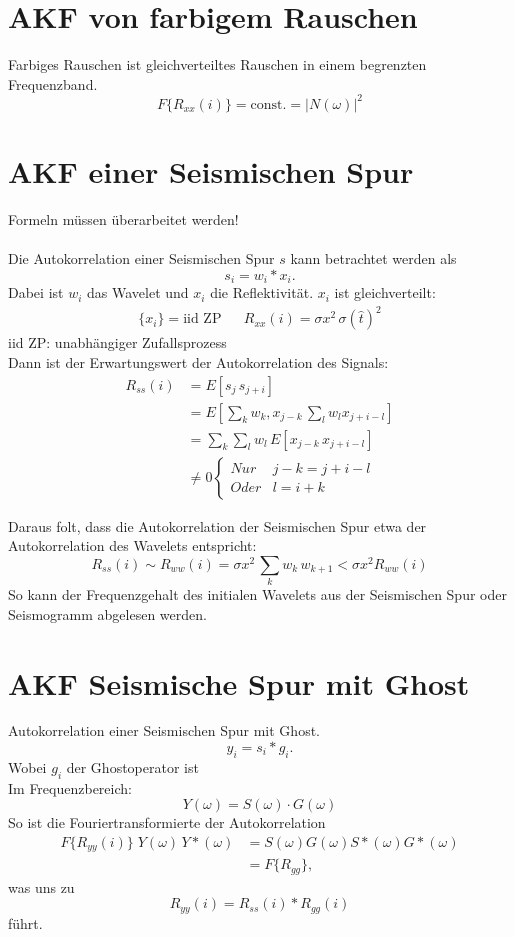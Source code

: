 \section*{AKF von farbigem Rauschen}
Farbiges Rauschen ist gleichverteiltes Rauschen in einem begrenzten Frequenzband.
\[
F\{R_{xx}(i)\} = \mbox{const.} = |N(\omega)|^2
\]

\section*{AKF einer Seismischen Spur}
Formeln müssen überarbeitet werden!\\\\

Die Autokorrelation einer Seismischen Spur $s$ kann betrachtet werden als
\[
s_i = w_i * x_i.
\]
{\small Dabei ist $w_i$ das Wavelet und $x_i$ die Reflektivität.}
$x_i$ ist gleichverteilt:
\begin{align*}
\{x_i\} = \mbox{iid ZP} & & R_{xx}(i) = \sigma x^2 \, \sigma(\hat{t})^2
\end{align*}
{\small iid ZP: unabhängiger Zufallsprozess}\\
Dann ist der Erwartungswert der Autokorrelation des Signals:
\begin{align*}
R_{ss}(i) & = E[s_j\, s_{j+i}]\\
& = E\left[\sum_k w_k, x_{j-k}\, \sum_l w_l x_{j+i-l}\right]\\
& = \sum_k \sum_l w_l\,E[x_{j-k}\,x_{j+i-l}]\\
& \not= 0
\begin{cases}
Nur & j-k = j+i-l\\
Oder & l = i+k
\end{cases}
\end{align*}

Daraus folt, dass die Autokorrelation der Seismischen Spur etwa der Autokorrelation des Wavelets entspricht:
\[
R_{ss}(i) \sim R_{ww}(i) = \sigma x^2 \, \sum_k w_k \, w_{k+1} < \sigma x^2 R_{ww}(i)
\]
So kann der Frequenzgehalt des initialen Wavelets aus der Seismischen Spur oder Seismogramm abgelesen werden.

\section*{AKF Seismische Spur mit Ghost}
Autokorrelation einer Seismischen Spur mit Ghost.
\[
y_i = s_i * g_i.
\]
{\small Wobei $g_i$ der Ghostoperator ist}\\
Im Frequenzbereich:
\[
Y(\omega) = S(\omega) \cdot G(\omega)
\]
So ist die Fouriertransformierte der Autokorrelation
\begin{align*}
F\{R_{yy}(i)\}\;Y(\omega)\,Y*(\omega) & = S(\omega) G(\omega) S*(\omega) G*(\omega)\\
& = F\{R_{gg}\},
\end{align*}
was uns zu
\[
R_{yy}(i) = R_{ss}(i)*R_{gg}(i)
\]
führt.